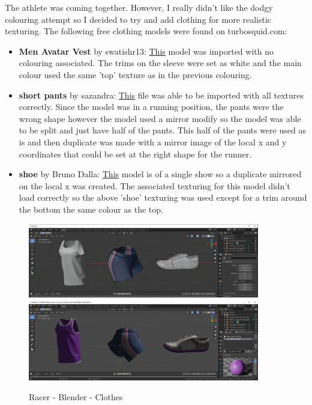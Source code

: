 \documentclass[a4 paper, 12pt]{article}
\begin{document}
The athlete was coming together. However, I really didn't like the dodgy colouring attempt so I decided to try and add clothing for more realistic texturing. The following free clothing models were found on turbosquid.com:
\begin{itemize}
    \item \textbf{Men Avatar Vest} by swatishr13: \href{https://www.turbosquid.com/FullPreview/Index.cfm/ID/1557152}{This} model was imported with no colouring associated. The trims on the sleeve were set as white and the main colour used the same 'top' texture as in the previous colouring. 
    \item \textbf{short pants} by sazandra: \href{https://www.turbosquid.com/FullPreview/Index.cfm/ID/1434049}{This} file was able to be imported with all textures correctly. Since the model was in a running position, the pants were the wrong shape however the model used a mirror modify so the model was able to be split and just have half of the pants. This half of the pants were used as is and then duplicate was made with a mirror image of the local x and y coordinates that could be set at the right shape for the runner.
    \item \textbf{shoe} by Bruno Dalla: \href{https://www.turbosquid.com/FullPreview/Index.cfm/ID/1217043}{This} model is of a single show so a duplicate mirrored on the local x was created. The associated texturing for this model didn't load correctly so the above 'shoe' texturing was used except for a trim around the bottom the same colour as the top.
\end{itemize}


\begin{figure} [H]
    \centering
    \includegraphics[width=0.9\textwidth, frame]
        {./images/olympics/athlete_clothes_base.PNG}
    \includegraphics[width=0.9\textwidth, frame]
        {./images/olympics/athlete_clothes_colour.PNG}    
    \caption{Racer - Blender - Clothes}   
\end{figure}
\end{document}
